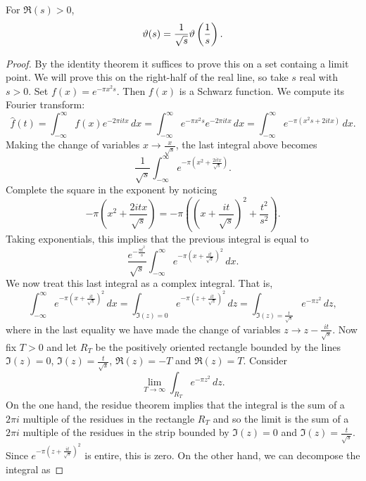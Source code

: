       \begin{theorem}
        For $\Re(s) > 0$,
        \[
          \vartheta(s) = \frac{1}{\sqrt{s}}\vartheta\left(\frac{1}{s}\right).
        \]
      \end{theorem}
      \begin{proof}
        By the identity theorem it suffices to prove this on a set containg a limit point. We will prove this on the right-half of the real line, so take $s$ real with $s > 0$. Set $f(x) = e^{-\pi x^{2}s}$. Then $f(x)$ is a Schwarz function. We compute its Fourier transform:
        \[
          \hat{f}(t) = \int_{-\infty}^{\infty}f(x)e^{-2\pi itx}\,dx = \int_{-\infty}^{\infty}e^{-\pi x^{2}s}e^{-2\pi itx}\,dx = \int_{-\infty}^{\infty}e^{-\pi(x^{2}s+2itx)}\,dx.
        \]
        Making the change of variables $x \to \frac{x}{\sqrt{s}}$, the last integral above becomes
        \[
          \frac{1}{\sqrt{s}}\int_{-\infty}^{\infty}e^{-\pi\left(x^{2}+\frac{2itx}{\sqrt{s}}\right)}.
        \]
        Complete the square in the exponent by noticing
        \[
          -\pi\left(x^{2}+\frac{2itx}{\sqrt{s}}\right) = -\pi\left(\left(x+\frac{it}{\sqrt{s}}\right)^{2}+\frac{t^{2}}{s^{2}}\right).
        \]
        Taking exponentials, this implies that the previous integral is equal to
        \[
          \frac{e^{-\frac{\pi t^{2}}{s}}}{\sqrt{s}}\int_{-\infty}^{\infty}e^{-\pi\left(x+\frac{it}{\sqrt{s}}\right)^{2}}\,dx.
        \]
        We now treat this last integral as a complex integral. That is,
        \begin{equation}\label{transformation_law_for_Jacobi's_theta_function_1}
          \int_{-\infty}^{\infty}e^{-\pi\left(x+\frac{it}{\sqrt{s}}\right)^{2}}\,dx = \int_{\Im(z) = 0}e^{-\pi\left(z+\frac{it}{\sqrt{s}}\right)^{2}}\,dz = \int_{\Im(z) = \frac{t}{\sqrt{s}}}e^{-\pi z^{2}}\,dz,
        \end{equation}
        where in the last equality we have made the change of variables $z \to z-\frac{it}{\sqrt{s}}$. Now fix $T > 0$ and let $R_{T}$ be the positively oriented rectangle bounded by the lines $\Im(z) = 0$, $\Im(z) = \frac{t}{\sqrt{s}}$, $\Re(z) = -T$ and $\Re(z) = T$. Consider
        \[
          \lim_{T \to \infty}\int_{R_{T}}e^{-\pi z^{2}}\,dz.
        \]
        On the one hand, the residue theorem implies that the integral is the sum of a $2\pi i$ multiple of the residues in the rectangle $R_{T}$ and so the limit is the sum of a $2\pi i$ multiple of the residues in the strip bounded by $\Im(z) = 0$ and $\Im(z) = \frac{t}{\sqrt{s}}$. Since $e^{-\pi\left(z+\frac{it}{\sqrt{s}}\right)^{2}}$ is entire, this is zero. On the other hand, we can decompose the integral as

\end{proof}
